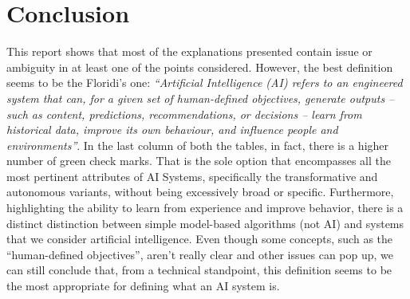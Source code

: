 \documentclass[12pt]{article}
\begin{document}
\section{Conclusion}
This report shows that most of the explanations presented contain issue or ambiguity in at least one of the points considered. However, the best definition seems to be the Floridi's one: \textit{“Artificial Intelligence (AI) refers to an engineered system that can, for a given set of human-defined objectives, generate outputs – such as content, predictions, recommendations, or decisions – learn from historical data, improve its own behaviour, and influence people and environments”}. In the last column of both the tables, in fact, there is a higher number of green check marks. That is the sole option that encompasses all the most pertinent attributes of AI Systems, specifically the transformative and autonomous variants, without being excessively broad or specific. Furthermore, highlighting the ability to learn from experience and improve behavior, there is a distinct distinction between simple model-based algorithms (not AI) and systems that we consider artificial intelligence.
Even though some concepts, such as the “human-defined objectives”, aren't really clear and other issues can pop up, we can still conclude that, from a technical standpoint, this definition seems to be the most appropriate for defining what an AI system is.      
    


	
	
    



\end{document}
